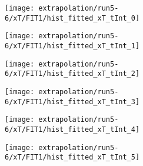 \begin{figure}
\centering
\caption{Fit to the flask subtracted yield ratio with FIT1 for $x_T$ for run 5-6.}
\label{fig:run5-6_FIT1_xT}
\begin{subfigure}{0.45\linewidth}
\texttt{[image: extrapolation/run5-6/xT/FIT1/hist\_fitted\_xT\_tInt\_0]}
\end{subfigure}
\begin{subfigure}{0.45\linewidth}
\texttt{[image: extrapolation/run5-6/xT/FIT1/hist\_fitted\_xT\_tInt\_1]}
\end{subfigure}
\begin{subfigure}{0.45\linewidth}
\texttt{[image: extrapolation/run5-6/xT/FIT1/hist\_fitted\_xT\_tInt\_2]}
\end{subfigure}
\begin{subfigure}{0.45\linewidth}
\texttt{[image: extrapolation/run5-6/xT/FIT1/hist\_fitted\_xT\_tInt\_3]}
\end{subfigure}
\begin{subfigure}{0.45\linewidth}
\texttt{[image: extrapolation/run5-6/xT/FIT1/hist\_fitted\_xT\_tInt\_4]}
\end{subfigure}
\begin{subfigure}{0.45\linewidth}
\texttt{[image: extrapolation/run5-6/xT/FIT1/hist\_fitted\_xT\_tInt\_5]}
\end{subfigure}
\end{figure}
